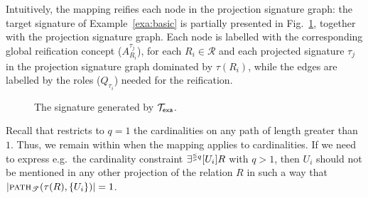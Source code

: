 \documentclass[draft]{article}
\newcommand{\pth}[2]{\ensuremath{\textsc{path}_{\mathscr{T}}(#1,#2)}\xspace}
\newcommand{\Texa}{\ensuremath{\Tmc_{\sf exa}}\xspace}
\begin{document}
Intuitively, the mapping reifies each node in the projection signature graph: the target \ALCQI signature of 
Example~\ref{exa:basic} is partially presented in Fig.~\ref{fig:mapping}, together with the projection signature graph. 
Each node is labelled with the corresponding global reification concept ($A_{R_i}^{\tau_j}$), for each %
$R_i\in\mathcal{R}$ and each projected signature $\tau_j$ in the projection signature graph dominated by $\tau(R_i)$, 
while the edges are labelled by the roles ($Q_{\tau_i}$) needed for the reification.
%
\begin{figure}[t]
\centering
\resizebox{\columnwidth}{!}{

}
\vspace*{-4.5ex}
\caption{\label{fig:mapping} The \ALCQI signature generated by \Texa.}
\end{figure} 


Recall that \DLRpm restricts to $q=1$ the cardinalities on any path of length greater than $1$.
Thus, we
remain within \ALCQI when the mapping applies to
cardinalities. If we need to express e.g.\ the cardinality constraint
$\exists^{{\scriptscriptstyle\lesseqgtr} q} [U_i]R$ %
with $q>1$,
then $U_i$ %
should not be mentioned in any other
projection of the relation $R$ in such a way that
$|\pth{\tau(R)}{\{U_i\}}|=1$. %
\end{document}
